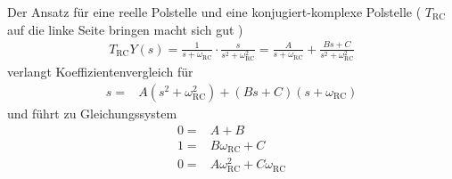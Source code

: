 \begin{Loesung}
\begin{itemize}
Der Ansatz für eine reelle Polstelle und eine konjugiert-komplexe Polstelle (
$T_\mathrm{RC}$ auf die linke Seite bringen macht sich gut
)
\begin{align}
T_\mathrm{RC} Y(s) = \frac{1}{s + \omega_\mathrm{RC}} \cdot \frac{s}{s^2+\omega_\mathrm{RC}^2} = \frac{A}{s+\omega_\mathrm{RC}} + \frac{B s + C}{s^2+\omega_\mathrm{RC}^2}
\end{align}
verlangt Koeffizientenvergleich für
\begin{align}
s =& A (s^2+\omega_\mathrm{RC}^2) + (B s + C) (s+\omega_\mathrm{RC})
\end{align}
und führt zu Gleichungssystem
\begin{align}
0 =& A + B\\
1 =& B \omega_\mathrm{RC} + C\\
0 =& A \omega_\mathrm{RC}^2 + C \omega_\mathrm{RC}
\end{align}

\end{itemize}
\end{Loesung}
